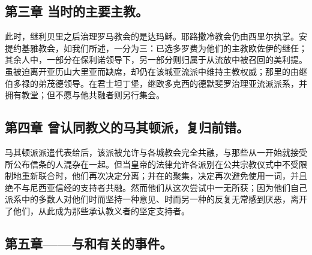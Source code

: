 
\subsection{第三章 当时的主要主教。}

此时，继利贝里之后治理罗马教会的是达玛稣。耶路撒冷教会仍由西里尔执掌。安提约基雅教会，如我们所述，一分为三：已选多罗费为他们的主教欧佐伊的继任；其余人中，一部分在保利诺领导下，另一部分则归属于从流放中被召回的美利提。虽被迫离开亚历山大里亚而缺席，却仍在该城亚流派中维持主教权威；那里的由继伯多禄的弟茂德领导。在君士坦丁堡，继欧多克西的德默斐罗治理亚流派派系，并拥有教堂；但不愿与他共融者则另行集会。\par


\subsection{第四章 曾认同教义的马其顿派，复归前错。}

马其顿派派遣代表给后，该派被允许与各城教会完全共融，与那些从一开始就接受所公布信条的人混杂在一起。但当皇帝的法律允许各派别在公共宗教仪式中不受限制地重新联合时，他们再次决定分离；并在的聚集，决定再次避免使用一词，并且绝不与尼西亚信经的支持者共融。然而他们从这次尝试中一无所获；因为他们自己派系中的多数人对他们时而坚持一种意见、时而另一种的反复无常感到厌恶，离开了他们，从此成为那些承认教义者的坚定支持者。\par


\subsection{第五章——与和有关的事件。}

